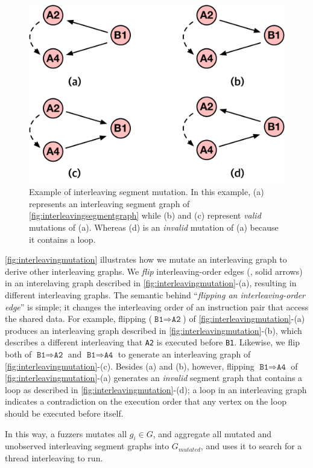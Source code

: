 \begin{figure}[t]
  \centering
  \includegraphics[width=0.7\linewidth]{fig/interleavingmutation.pdf}
  \caption{Example of interleaving segment mutation. In this example,
    (a) represents an interleaving segment graph of
    \autoref{fig:interleavingsegmentgraph} while (b) and (c) represent
    \textit{valid} mutations of (a). Whereas (d) is an
    \textit{invalid} mutation of (a) because it contains a loop.}
  \label{fig:interleavingmutation}
\end{figure}
%
\autoref{fig:interleavingmutation} illustrates how we mutate an
interleaving graph to derive other interleaving graphs.
%
We \textit{flip} interleaving-order edges (\ie, solid arrows) in an
interelaving graph described in
\autoref{fig:interleavingmutation}-(a), resulting in different
interleaving graphs.
%
The semantic behind ``\textit{flipping an interleaving-order edge}''
is simple; it changes the interleaving order of an instruction pair
that access the shared data.
%
For example, flipping ($\texttt{B1} \Rightarrow \texttt{A2}$) of
\autoref{fig:interleavingmutation}-(a) produces an interleaving graph
described in \autoref{fig:interleavingmutation}-(b), which describes a
different interleaving that \texttt{A2} is executed before
\texttt{B1}.
%
Likewise, we flip both of $\texttt{B1} \Rightarrow \texttt{A2}$ and
$\texttt{B1} \Rightarrow \texttt{A4}$ to generate an interleaving
graph of \autoref{fig:interleavingmutation}-(c).
%
Besides (a) and (b), however, flipping
$\texttt{B1} \Rightarrow \texttt{A4}$ of
\autoref{fig:interleavingmutation}-(a) generates an \textit{invalid}
segment graph that contains a loop as described in
\autoref{fig:interleavingmutation}-(d); a loop in an interleaving
graph indicates a contradiction on the execution order that any vertex
on the loop should be executed before itself.


In this way, a fuzzers mutates all $g_i \in G$, and aggregate all
mutated and unobserved interleaving segment graphs into $G_{mutated}$,
and uses it to search for a thread interleaving to run.


